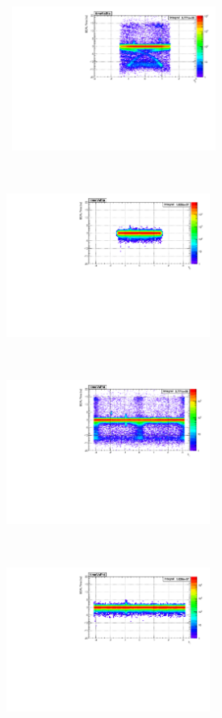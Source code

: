 \paragraph*{}\mbox{}\\
\begin{minipage}{\linewidth} 
\begin{center}
\centering
\mbox{
\includegraphics[height=6cm, width=0.5\textwidth]{THESISPLOTS/SinglePhotonDataSet-TimeVsEtaEB.pdf}
\includegraphics[height=6cm, width=0.5\textwidth]
{THESISPLOTS/ZCandidates_TimeVsEta.pdf}}
\mbox{
\includegraphics[height=6cm, width=0.5\textwidth]{THESISPLOTS/SinglePhotonDataSet-TimeVsPhiEB.pdf}
\includegraphics[height=6cm, width=0.5\textwidth]{THESISPLOTS/ZCandidates_TimeVsPhi.pdf}}

\end{center}
\end{minipage}

